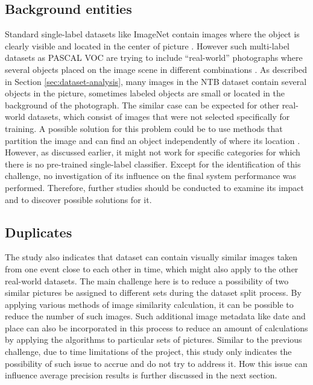 \subsection{Background entities}
Standard single-label datasets like ImageNet contain images where the object is clearly visible and located in the center of picture \cite{Russakovsky2015ImageNet}. However such multi-label datasets as PASCAL VOC are trying to include ``real-world'' photographs where several objects placed on the image scene in different combinations \cite{Everingham2010PASCAL-VOC}. As described in Section \ref{sec:dataset-analysis}, many images in the NTB dataset contain several objects in the picture, sometimes labeled objects are small or located in the background of the photograph. The similar case can be expected for other real-world datasets, which consist of images that were not selected specifically for training. A possible solution for this problem could be to use methods that partition the image and can find an object independently of where its location \cite{Ren2016, Yang2015, Wei2016HCP}. However, as discussed earlier, it might not work for specific categories for which there is no pre-trained single-label classifier. Except for the identification of this challenge, no investigation of its influence on the final system performance was performed. Therefore, further studies should be conducted to examine its impact and to discover possible solutions for it.

\subsection{Duplicates}
The study also indicates that dataset can contain visually similar images taken from one event close to each other in time, which might also apply to the other real-world datasets. The main challenge here is to reduce a possibility of two similar pictures be assigned to different sets during the dataset split process. By applying various methods of image similarity calculation, it can be possible to reduce the number of such images. Such additional image metadata like date and place can also be incorporated in this process to reduce an amount of calculations by applying the algorithms to particular sets of pictures. Similar to the previous challenge, due to time limitations of the project, this study only indicates the possibility of such issue to accrue and do not try to address it. How this issue can influence average precision results is further discussed in the next section.

